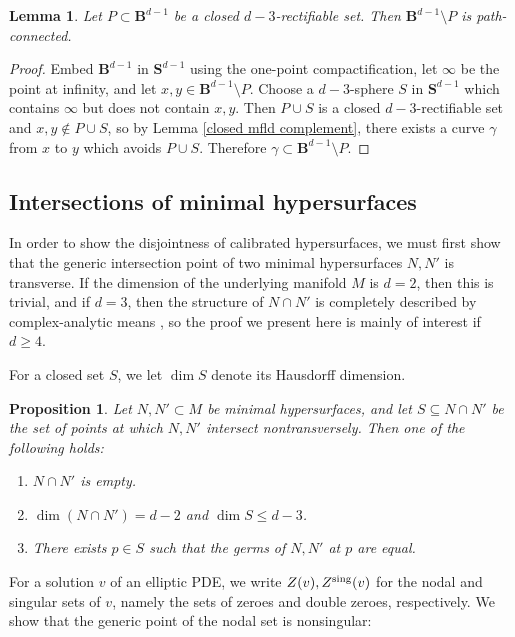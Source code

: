 \documentclass[reqno,11pt]{amsart}
\newcommand{\Sph}{\mathbf S}
\newcommand{\Ball}{\mathbf{B}}
\newtheorem{lemma}[theorem]{Lemma}
\newtheorem{proposition}[theorem]{Proposition}
\theoremstyle{definition}
\numberwithin{equation}{section}
\begin{document}
\begin{lemma}\label{open mfld complement}
Let $P \subset \Ball^{d - 1}$ be a closed $d - 3$-rectifiable set.
Then $\Ball^{d - 1} \setminus P$ is path-connected.
\end{lemma}
\begin{proof}
Embed $\Ball^{d - 1}$ in $\Sph^{d - 1}$ using the one-point compactification, let $\infty$ be the point at infinity, and let $x, y \in \Ball^{d - 1} \setminus P$.
Choose a $d - 3$-sphere $S$ in $\Sph^{d - 1}$ which contains $\infty$ but does not contain $x, y$.
Then $P \cup S$ is a closed $d - 3$-rectifiable set and $x, y \notin P \cup S$, so by Lemma \ref{closed mfld complement}, there exists a curve $\gamma$ from $x$ to $y$ which avoids $P \cup S$.
Therefore $\gamma \subset \Ball^{d - 1} \setminus P$.
\end{proof}

\subsection{Intersections of minimal hypersurfaces}\label{nodal appendix}
In order to show the disjointness of calibrated hypersurfaces, we must first show that the generic intersection point of two minimal hypersurfaces $N, N'$ is transverse.
If the dimension of the underlying manifold $M$ is $d = 2$, then this is trivial, and if $d = 3$, then the structure of $N \cap N'$ is completely described by complex-analytic means \cite[Theorem 7.3]{colding2011course}, so the proof we present here is mainly of interest if $d \geq 4$.

For a closed set $S$, we let $\dim S$ denote its Hausdorff dimension.

\begin{proposition}\label{intersection theory prop}
Let $N, N' \subset M$ be minimal hypersurfaces, and let $S \subseteq N \cap N'$ be the set of points at which $N, N'$ intersect nontransversely.
Then one of the following holds:
\begin{enumerate}
\item $N \cap N'$ is empty.
\item $\dim(N \cap N') = d - 2$ and $\dim S \leq d - 3$.
\item There exists $p \in S$ such that the germs of $N, N'$ at $p$ are equal.
\end{enumerate}
\end{proposition}

For a solution $v$ of an elliptic PDE, we write $Z(v), Z^{\rm sing}(v)$ for the nodal and singular sets of $v$, namely the sets of zeroes and double zeroes, respectively.
We show that the generic point of the nodal set is nonsingular:
\end{document}
